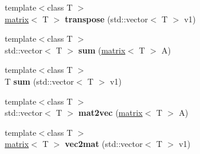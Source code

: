 \begin{DoxyCompactItemize}
\item 
\hypertarget{namespacekeycpp_aa148d677899a0da5ab14edfc5057a97b}{{\footnotesize template$<$class T $>$ }\\\hyperlink{classkeycpp_1_1matrix}{matrix}$<$ T $>$ {\bfseries transpose} (std\-::vector$<$ T $>$ v1)}\label{namespacekeycpp_aa148d677899a0da5ab14edfc5057a97b}

\item 
\hypertarget{namespacekeycpp_a4aedb589e76ced5d79d62c5f72029adb}{{\footnotesize template$<$class T $>$ }\\std\-::vector$<$ T $>$ {\bfseries sum} (\hyperlink{classkeycpp_1_1matrix}{matrix}$<$ T $>$ A)}\label{namespacekeycpp_a4aedb589e76ced5d79d62c5f72029adb}

\item 
\hypertarget{namespacekeycpp_ad05b888638b5ea7103bdc6ba0882d47d}{{\footnotesize template$<$class T $>$ }\\T {\bfseries sum} (std\-::vector$<$ T $>$ v1)}\label{namespacekeycpp_ad05b888638b5ea7103bdc6ba0882d47d}

\item 
\hypertarget{namespacekeycpp_a8a0e8201f775945a0a61d6d645a3456e}{{\footnotesize template$<$class T $>$ }\\std\-::vector$<$ T $>$ {\bfseries mat2vec} (\hyperlink{classkeycpp_1_1matrix}{matrix}$<$ T $>$ A)}\label{namespacekeycpp_a8a0e8201f775945a0a61d6d645a3456e}

\item 
\hypertarget{namespacekeycpp_a4d3ef9b10b3db438529bafc5e74fa0dc}{{\footnotesize template$<$class T $>$ }\\\hyperlink{classkeycpp_1_1matrix}{matrix}$<$ T $>$ {\bfseries vec2mat} (std\-::vector$<$ T $>$ v1)}\label{namespacekeycpp_a4d3ef9b10b3db438529bafc5e74fa0dc}


\end{DoxyCompactItemize}
